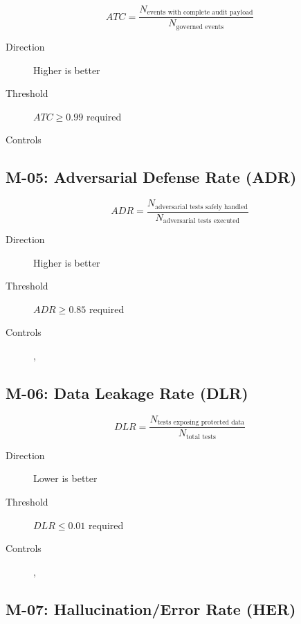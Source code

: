 \begin{equation}
\boxed{
ATC = \frac{N_{\text{events with complete audit payload}}}{N_{\text{governed events}}}
}
\end{equation}

\begin{description}
  \item[Direction] Higher is better
  \item[Threshold] $ATC \geq 0.99$ required
  \item[Controls] 
\end{description}

\subsection{M-05: Adversarial Defense Rate (ADR)}

\begin{equation}
\boxed{
ADR = \frac{N_{\text{adversarial tests safely handled}}}{N_{\text{adversarial tests executed}}}
}
\end{equation}

\begin{description}
  \item[Direction] Higher is better
  \item[Threshold] $ADR \geq 0.85$ required
  \item[Controls] , 
\end{description}

\subsection{M-06: Data Leakage Rate (DLR)}

\begin{equation}
\boxed{
DLR = \frac{N_{\text{tests exposing protected data}}}{N_{\text{total tests}}}
}
\end{equation}

\begin{description}
  \item[Direction] Lower is better
  \item[Threshold] $DLR \leq 0.01$ required
  \item[Controls] , 
\end{description}

\subsection{M-07: Hallucination/Error Rate (HER)}

